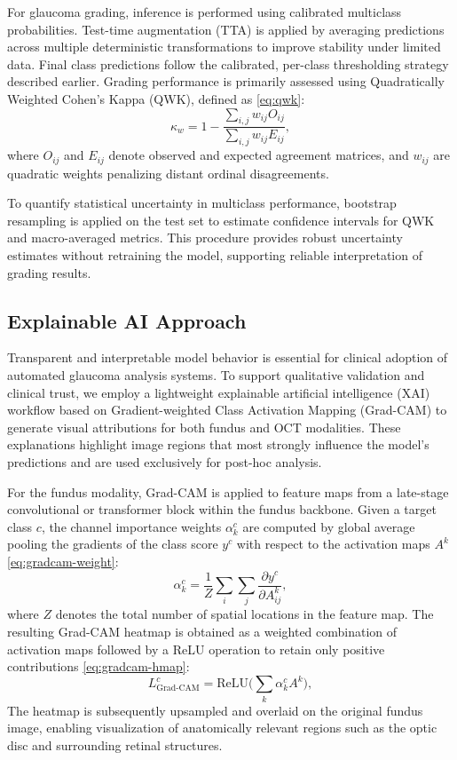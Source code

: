 \documentclass[preprint,12pt]{elsarticle}
\newcommand{\eqrefp}[1]{\eqref{#1}}
\begin{document}
For glaucoma grading, inference is performed using calibrated multiclass probabilities. Test-time augmentation (TTA) is applied by averaging predictions across multiple deterministic transformations to improve stability under limited data. Final class predictions follow the calibrated, per-class thresholding strategy described earlier. Grading performance is primarily assessed using Quadratically Weighted Cohen’s Kappa (QWK), defined as \eqrefp{eq:qwk}:
\begin{equation}
    \kappa_w =
    1 -
    \frac{\sum_{i,j} w_{ij} O_{ij}}{\sum_{i,j} w_{ij} E_{ij}},
    \label{eq:qwk}
\end{equation}
where $O_{ij}$ and $E_{ij}$ denote observed and expected agreement matrices, and $w_{ij}$ are quadratic weights penalizing distant ordinal disagreements.

To quantify statistical uncertainty in multiclass performance, bootstrap resampling is applied on the test set to estimate confidence intervals for QWK and macro-averaged metrics. This procedure provides robust uncertainty estimates without retraining the model, supporting reliable interpretation of grading results.


\subsection{Explainable AI Approach}
\label{subsec:xai}

Transparent and interpretable model behavior is essential for clinical adoption of automated glaucoma analysis systems. To support qualitative validation and clinical trust, we employ a lightweight explainable artificial intelligence (XAI) workflow based on Gradient-weighted Class Activation Mapping (Grad-CAM) to generate visual attributions for both fundus and OCT modalities. These explanations highlight image regions that most strongly influence the model’s predictions and are used exclusively for post-hoc analysis.

For the fundus modality, Grad-CAM is applied to feature maps from a late-stage convolutional or transformer block within the fundus backbone. Given a target class $c$, the channel importance weights $\alpha_k^c$ are computed by global average pooling the gradients of the class score $y^c$ with respect to the activation maps $A^k$ \eqrefp{eq:gradcam-weight}:
\begin{equation}
    \alpha_k^c = \frac{1}{Z} \sum_i \sum_j \frac{\partial y^c}{\partial A_{ij}^k},
    \label{eq:gradcam-weight}
\end{equation}
where $Z$ denotes the total number of spatial locations in the feature map. The resulting Grad-CAM heatmap is obtained as a weighted combination of activation maps followed by a ReLU operation to retain only positive contributions \eqrefp{eq:gradcam-hmap}:
\begin{equation}
    L_{\text{Grad-CAM}}^c = \mathrm{ReLU}\Big( \sum_k \alpha_k^c A^k \Big),
    \label{eq:gradcam-hmap}
\end{equation}
The heatmap is subsequently upsampled and overlaid on the original fundus image, enabling visualization of anatomically relevant regions such as the optic disc and surrounding retinal structures.
\end{document}
